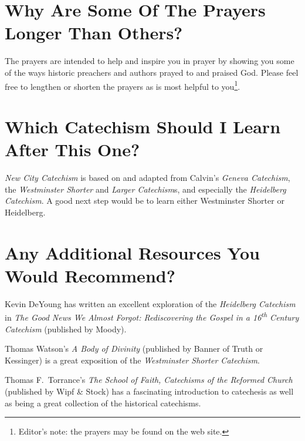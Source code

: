 \documentclass[]{memoir}
\begin{document}
\section[Why Are Some Of The Prayers Longer Than Others?][Why Are Some Prayers Longer?]{Why Are Some Of The Prayers Longer Than Others?}

The prayers are intended to help and inspire you in prayer by showing you some of the ways historic preachers and authors prayed to and praised God. Please feel free to lengthen or shorten the prayers as is most helpful to you\footnote{Editor's note: the prayers may be found on the web site.}.

\section[Which Catechism Should I Learn After This One?][Next Catechism After This One?]{Which Catechism Should I Learn After This One?}

\emph{New City Catechism}\/ is based on and adapted from Calvin's {\em Geneva Catechism}, the {\em Westminster Shorter}\/ and {\em Larger Catechism}s, and especially the {\em Heidelberg Catechism}. A good next step would be to learn either Westminster Shorter or Heidelberg.

\section[Any Additional Resources You Would Recommend?][Additional Resources?]{Any Additional Resources You Would Recommend?}

Kevin DeYoung has written an excellent exploration of the \emph{Heidelberg Catechism}\/ in \emph{The Good News We Almost Forgot: Rediscovering the Gospel\/ in a 16\textsuperscript{th} Century Catechism}\/ (published by Moody).

Thomas Watson's \emph{A Body of Divinity}\/ (published by Banner of Truth or Kessinger) is a great exposition of the \emph{Westminster Shorter Catechism}.

Thomas F.\ Torrance's \emph{The School of Faith, Catechisms of the Reformed Church}\/ (published by Wipf \& Stock) has a fascinating introduction to catechesis as well as being a great collection of the historical catechisms.
\end{document}
